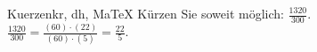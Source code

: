 \begin{MAufgabe}{Kuerzen}{kr, dh, MaTeX}
K\"urzen Sie soweit m\"oglich: $\frac{1320}{300}$.\\ 
\ifLsg\MLoesung
\quad $\frac{1320}{300}=\frac{(60)\cdot(22)}{(60)\cdot(5)}=\frac{22}{5}$.\else\relax\fi
 \end{MAufgabe}